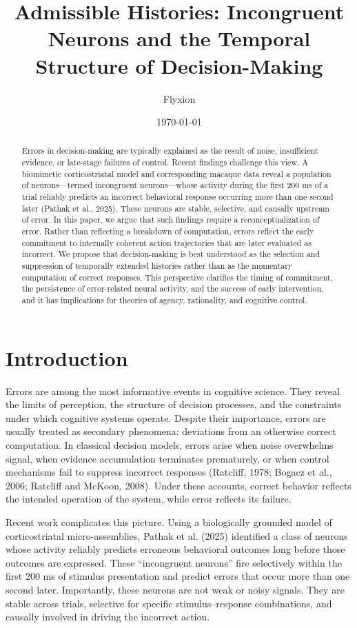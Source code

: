 \documentclass[11pt]{article}
\title{Admissible Histories: Incongruent Neurons and the Temporal Structure of Decision-Making}
\author{Flyxion}
\date{\today}
\begin{document}
\maketitle

\begin{abstract}
Errors in decision-making are typically explained as the result of noise, insufficient evidence, or late-stage failures of control. Recent findings challenge this view. A biomimetic corticostriatal model and corresponding macaque data reveal a population of neurons—termed incongruent neurons—whose activity during the first 200 ms of a trial reliably predicts an incorrect behavioral response occurring more than one second later (Pathak et al., 2025). These neurons are stable, selective, and causally upstream of error. In this paper, we argue that such findings require a reconceptualization of error. Rather than reflecting a breakdown of computation, errors reflect the early commitment to internally coherent action trajectories that are later evaluated as incorrect. We propose that decision-making is best understood as the selection and suppression of temporally extended histories rather than as the momentary computation of correct responses. This perspective clarifies the timing of commitment, the persistence of error-related neural activity, and the success of early intervention, and it has implications for theories of agency, rationality, and cognitive control.
\end{abstract}

\section{Introduction}

Errors are among the most informative events in cognitive science. They reveal the limits of perception, the structure of decision processes, and the constraints under which cognitive systems operate. Despite their importance, errors are usually treated as secondary phenomena: deviations from an otherwise correct computation. In classical decision models, errors arise when noise overwhelms signal, when evidence accumulation terminates prematurely, or when control mechanisms fail to suppress incorrect responses (Ratcliff, 1978; Bogacz et al., 2006; Ratcliff and McKoon, 2008). Under these accounts, correct behavior reflects the intended operation of the system, while error reflects its failure.

Recent work complicates this picture. Using a biologically grounded model of corticostriatal micro-assemblies, Pathak et al. (2025) identified a class of neurons whose activity reliably predicts erroneous behavioral outcomes long before those outcomes are expressed. These “incongruent neurons” fire selectively within the first 200 ms of stimulus presentation and predict errors that occur more than one second later. Importantly, these neurons are not weak or noisy signals. They are stable across trials, selective for specific stimulus–response combinations, and causally involved in driving the incorrect action.
\end{document}
